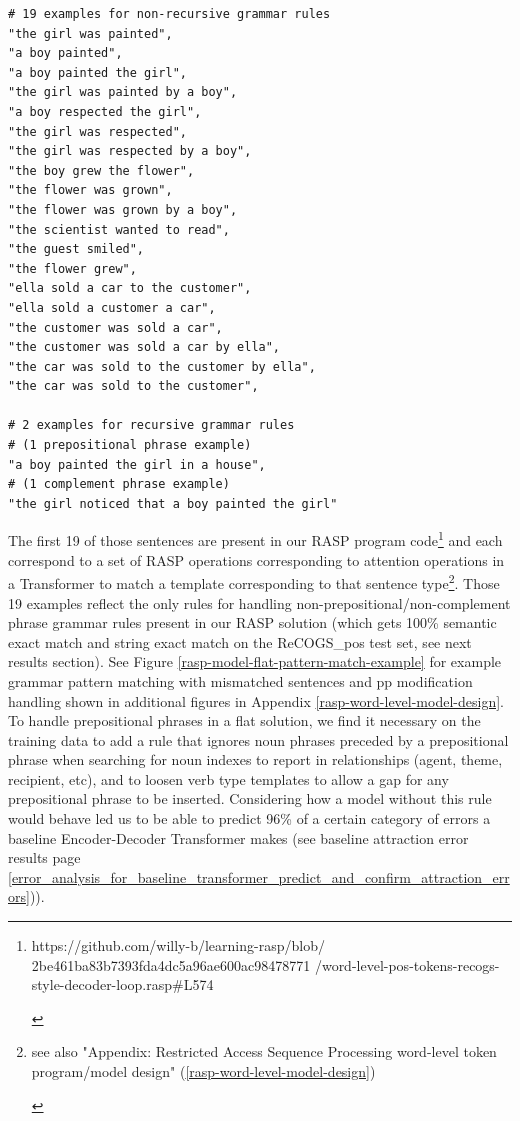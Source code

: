 \documentclass[11pt]{article}
\begin{document}
\begin{tiny}
\begin{verbatim}
# 19 examples for non-recursive grammar rules
"the girl was painted", 
"a boy painted",
"a boy painted the girl",
"the girl was painted by a boy",
"a boy respected the girl", 
"the girl was respected",
"the girl was respected by a boy",
"the boy grew the flower",
"the flower was grown",
"the flower was grown by a boy",
"the scientist wanted to read",
"the guest smiled",
"the flower grew",
"ella sold a car to the customer",
"ella sold a customer a car",
"the customer was sold a car",
"the customer was sold a car by ella",
"the car was sold to the customer by ella",
"the car was sold to the customer",

# 2 examples for recursive grammar rules
# (1 prepositional phrase example)
"a boy painted the girl in a house",
# (1 complement phrase example)
"the girl noticed that a boy painted the girl"
\end{verbatim}
\end{tiny}

The first 19 of those sentences are present in our RASP program code\footnote{\begin{footnotesize}https://github.com/willy-b/learning-rasp/blob/
2be461ba83b7393fda4dc5a96ae600ac98478771
/word-level-pos-tokens-recogs-style-decoder-loop.rasp\#L574\end{footnotesize}}
and each correspond to a set of RASP operations corresponding to attention operations in a Transformer to match a template corresponding to that sentence type\footnote{\begin{footnotesize}see also "Appendix: Restricted Access Sequence Processing word-level token program/model design" (\ref{rasp-word-level-model-design})

\end{footnotesize}
}. Those 19 examples reflect the only rules for handling non-prepositional/non-complement phrase grammar rules
present in our RASP solution (which gets 100\% semantic exact match and string exact match on the \cite{Wu2023} ReCOGS\_pos test set, see next results section). See Figure \ref{rasp-model-flat-pattern-match-example} for example grammar pattern matching with mismatched sentences and pp modification handling shown in additional figures in Appendix \ref{rasp-word-level-model-design}. To handle prepositional phrases in a flat solution, we find it necessary on the training data to add a rule that ignores noun phrases preceded by a prepositional phrase when searching for noun indexes to report in relationships (agent, theme, recipient, etc), and to loosen verb type templates to allow a gap for any prepositional phrase to be inserted. Considering how a model without this rule would behave led us to be able to predict 96\% of a certain category of errors a baseline Encoder-Decoder Transformer makes (see baseline attraction error results page \ref{error_analysis_for_baseline_transformer_predict_and_confirm_attraction_errors})).
\end{document}
